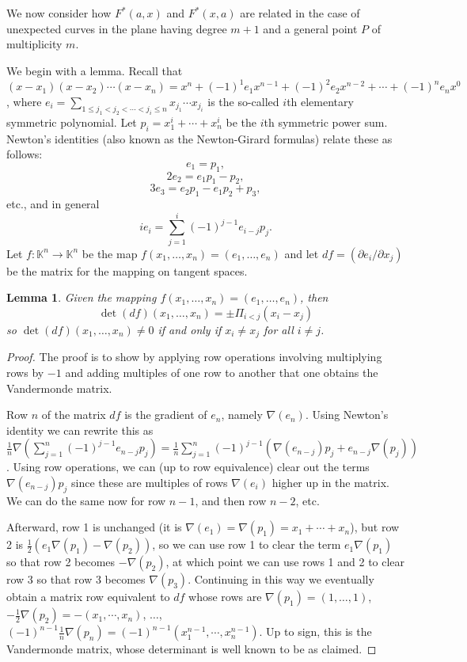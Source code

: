 \documentclass[12pt]{amsart}
\numberwithin{equation}{section}
\newtheorem{lemma}[theorem]{Lemma}
\theoremstyle{definition}
\newcommand{\KK}{ \ensuremath{\mathbb{K}}}
\begin{document}
We now consider how $F^*(a,x)$ and $F^*(x,a)$ are related in the case of unexpected curves in the plane having
degree $m+1$ and a general point $P$ of multiplicity $m$. 

We begin with a lemma. Recall that $(x-x_1)(x-x_2)\cdots(x-x_n)=x^n+(-1)^1e_1x^{n-1}+(-1)^2e_2x^{n-2}+\cdots+(-1)^ne_nx^0$,
where $e_i=\sum_{1\leq j_1<j_2<\cdots<j_i\leq n}x_{j_1}\cdots x_{j_i}$ is the so-called $i$th elementary symmetric polynomial.
Let $p_i=x_1^i+\cdots+x_n^i$ be the $i$th symmetric power sum. Newton's identities (also known as the Newton-Girard formulas)
relate these as follows:
$$e_1=p_1,$$
$$2e_2=e_1p_1-p_2,$$
$$3e_3=e_2p_1-e_1p_2+p_3,$$
etc., and in general
$$ie_i=\sum_{j=1}^i(-1)^{j-1}e_{i-j}p_j.$$
Let $f:\KK^n\to \KK^n$ be the map $f(x_1,\ldots,x_n)=(e_1,\ldots,e_n)$ and let $df=(\partial e_i/\partial x_j)$ be the
matrix for the mapping on tangent spaces.

\begin{lemma}\label{diffMap} 
Given the mapping $f(x_1,\ldots,x_n)=(e_1,\ldots,e_n)$, then 
$$\det(df)(x_1,\ldots,x_n)=\pm \Pi_{i<j}(x_i-x_j)$$ 
so $\det(df)(x_1,\ldots,x_n)\neq0$ if and only if $x_i\neq x_j$ for all $i\neq j$.
\end{lemma}

\begin{proof} 
The proof is to show by applying row operations involving multiplying rows by $-1$
and adding multiples of one row to another
that one obtains the Vandermonde matrix.

Row $n$ of the matrix $df$ is the gradient of $e_n$, namely $\nabla(e_n)$. Using Newton's identity we can rewrite this as
$\frac{1}{n}\nabla(\sum_{j=1}^n(-1)^{j-1}e_{n-j}p_j)=\frac{1}{n}\sum_{j=1}^n(-1)^{j-1}(\nabla(e_{n-j})p_j+e_{n-j}\nabla(p_j))$.
Using row operations, we can (up to row equivalence) clear out the terms $\nabla(e_{n-j})p_j$ since these are multiples 
of rows $\nabla(e_i)$ higher up in the matrix. We can do the same now for row $n-1$, and then row $n-2$, etc.

Afterward, row 1 is unchanged (it is $\nabla(e_1)=\nabla(p_1)=x_1+\cdots+x_n$), but row 2 is 
$\frac{1}{2}(e_1\nabla(p_1)-\nabla(p_2))$, so we can use row 1 to clear the term $e_1\nabla(p_1)$ so that row 2 becomes
$-\nabla(p_2)$, at which point we can use rows 1 and 2 to clear row 3 so that row 3 becomes $\nabla(p_3)$.
Continuing in this way we eventually obtain a matrix row equivalent to $df$ whose rows are
$\nabla(p_1)=(1,\ldots,1)$, $-\frac{1}{2}\nabla(p_2)=-(x_1,\cdots,x_n)$, $\ldots$, $(-1)^{n-1}\frac{1}{n}\nabla(p_n)=(-1)^{n-1}(x_1^{n-1},\cdots,x_n^{n-1})$. 
Up to sign, this is the Vandermonde matrix, whose determinant is well known to be as claimed.
\end{proof}
\end{document}
